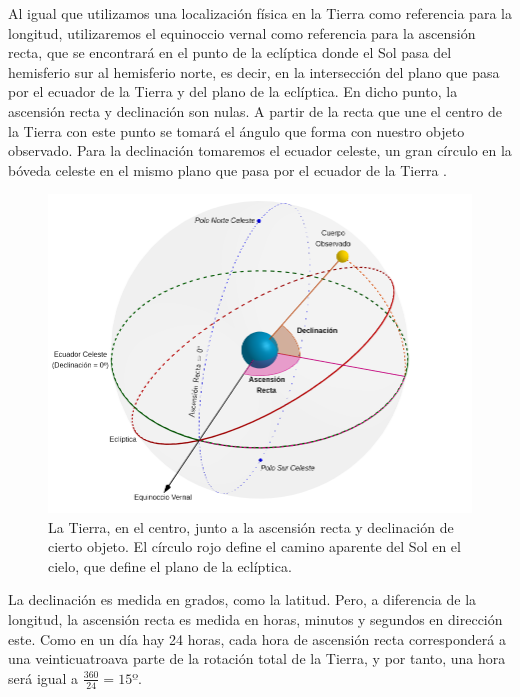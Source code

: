Al igual que utilizamos una localización física en la Tierra como referencia para la longitud, utilizaremos el equinoccio vernal como referencia para la ascensión recta, que se encontrará en el punto de la eclíptica donde el Sol pasa del hemisferio sur al hemisferio norte, es decir, en la intersección del plano que pasa por el ecuador de la Tierra y del plano de la eclíptica. En dicho punto, la ascensión recta y declinación son nulas. A partir de la recta que une el centro de la Tierra con este punto se tomará el ángulo que forma con nuestro objeto observado. Para la declinación tomaremos el ecuador celeste, un gran círculo en la bóveda celeste en el mismo plano que pasa por el ecuador de la Tierra \cite{right_ascension_declination}.\\

\begin{figure}[H]
\centering
\includegraphics[scale=0.4]{images/ascension_declinacion.png}
\caption{La Tierra, en el centro, junto a la ascensión recta y declinación de cierto objeto. El círculo rojo define el camino aparente del Sol en el cielo, que define el plano de la eclíptica.}
\label{fig:ascension_declinacion}
\end{figure}

La declinación es medida en grados, como la latitud. Pero, a diferencia de la longitud, la ascensión recta es medida en horas, minutos y segundos en dirección este. Como en un día hay 24 horas, cada hora de ascensión recta corresponderá a una veinticuatroava parte de la rotación total de la Tierra, y por tanto, una hora será igual a $\frac{360}{24}=15º$.\\

